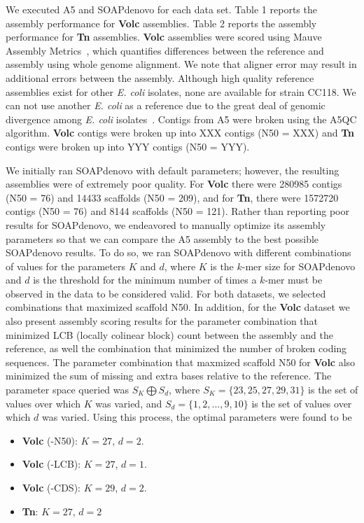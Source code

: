 \documentclass{bioinfo}
\begin{document}
We executed A5 and SOAPdenovo for each data set. Table 1 reports the assembly performance for \textbf{Volc} assemblies.
Table 2 reports the assembly performance for \textbf{Tn} assemblies. \textbf{Volc} assemblies were scored using Mauve Assembly 
Metrics~\citep{Darling2011}, which quantifies differences between the reference and assembly using whole genome alignment. We note that
aligner error may result in additional errors between the assembly. Although high quality reference assemblies exist for other \textit{E. coli} 
isolates, none are available for strain CC118. We can not use another \textit{E. coli} as a reference due to the great deal of genomic divergence
among \textit{E. coli} isolates~\citep{Perna2001}.
 Contigs from A5 were broken using the A5QC algorithm. \textbf{Volc} contigs were broken up into XXX contigs (N50 = XXX) and \textbf{Tn} contigs were broken up into YYY contigs (N50 = YYY). 

We initially ran SOAPdenovo with default parameters; however, the resulting assemblies were of extremely poor quality. For \textbf{Volc} there were
280985 contigs (N50 = 76) and 14433 scaffolds (N50 = 209), and for \textbf{Tn}, there were 1572720 contigs (N50 = 76) and 8144 scaffolds (N50 = 121). 
Rather than reporting poor results for SOAPdenovo, we endeavored to manually optimize its assembly parameters so that we can compare the A5 assembly
to the best possible SOAPdenovo results. 
To do so, we ran SOAPdenovo with different combinations of values for the parameters $K$ and $d$, where $K$ is the $k$-mer size for SOAPdenovo and $d$
is the threshold for the minimum number of times a $k$-mer must be observed in the data to be considered valid.
For both datasets, we selected combinations that maximized scaffold N50. In addition, for the \textbf{Volc} dataset we also present assembly scoring
results for the parameter combination that minimized LCB (locally colinear block) count between the assembly and the reference, as well the combination that minimized the
number of broken coding sequences. The parameter combination that maxmized scaffold N50 for \textbf{Volc} also minimized the sum
of missing and extra bases relative to the reference. The parameter space queried was $S_K \bigoplus S_d$,
where $S_K = \{23,25,27,29,31\}$ is the set of values over which $K$ was varied, and $S_d = \{1,2,...,9,10\}$ is the set of values over which $d$
was varied. 
Using this process, the optimal parameters were found to be
\begin{itemize}
\item \textbf{Volc} (-N50): $K = 27$, $d = 2$.
\item \textbf{Volc} (-LCB): $K = 27$, $d = 1$.
\item \textbf{Volc} (-CDS): $K = 29$, $d = 2$.
\item \textbf{Tn}: $K = 27$, $d = 2$
\end{itemize}
\end{document}
